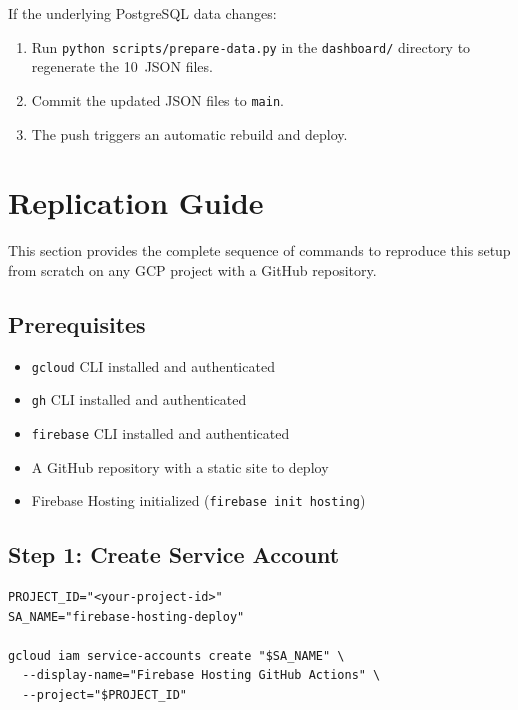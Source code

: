 \documentclass[11pt,a4paper]{article}
\theoremstyle{plainref}
\begin{document}
If the underlying PostgreSQL data changes:

\begin{enumerate}
  \item Run \texttt{python scripts/prepare-data.py} in the \texttt{dashboard/}
        directory to regenerate the 10~JSON files.
  \item Commit the updated JSON files to \texttt{main}.
  \item The push triggers an automatic rebuild and deploy.
\end{enumerate}

\section{Replication Guide}

This section provides the complete sequence of commands to reproduce this setup
from scratch on any GCP project with a GitHub repository.

\subsection{Prerequisites}

\begin{itemize}
  \item \texttt{gcloud} CLI installed and authenticated
  \item \texttt{gh} CLI installed and authenticated
  \item \texttt{firebase} CLI installed and authenticated
  \item A GitHub repository with a static site to deploy
  \item Firebase Hosting initialized (\texttt{firebase init hosting})
\end{itemize}

\subsection{Step 1: Create Service Account}

\begin{verbatim}
PROJECT_ID="<your-project-id>"
SA_NAME="firebase-hosting-deploy"

gcloud iam service-accounts create "$SA_NAME" \
  --display-name="Firebase Hosting GitHub Actions" \
  --project="$PROJECT_ID"
\end{verbatim}
\end{document}

